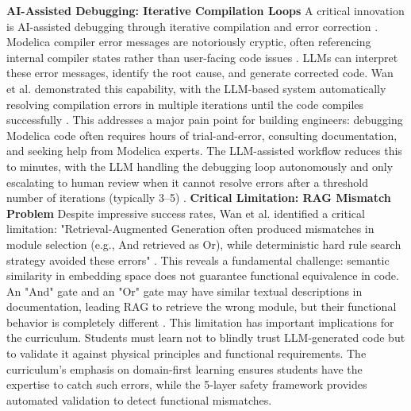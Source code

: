 \documentclass[12pt,a4paper]{article}
\begin{document}
\textbf{AI-Assisted Debugging: Iterative Compilation Loops}
A critical innovation is AI-assisted debugging through iterative compilation and error correction \cite{ref61}. Modelica compiler error messages are notoriously cryptic, often referencing internal compiler states rather than user-facing code issues \cite{ref61}. LLMs can interpret these error messages, identify the root cause, and generate corrected code. Wan et al. demonstrated this capability, with the LLM-based system automatically resolving compilation errors in multiple iterations until the code compiles successfully \cite{ref61}.
This addresses a major pain point for building engineers: debugging Modelica code often requires hours of trial-and-error, consulting documentation, and seeking help from Modelica experts. The LLM-assisted workflow reduces this to minutes, with the LLM handling the debugging loop autonomously and only escalating to human review when it cannot resolve errors after a threshold number of iterations (typically 3--5) \cite{ref61}.
\textbf{Critical Limitation: RAG Mismatch Problem}
Despite impressive success rates, Wan et al. identified a critical limitation: "Retrieval-Augmented Generation often produced mismatches in module selection (e.g., And retrieved as Or), while deterministic hard rule search strategy avoided these errors" \cite{ref61}. This reveals a fundamental challenge: semantic similarity in embedding space does not guarantee functional equivalence in code. An "And" gate and an "Or" gate may have similar textual descriptions in documentation, leading RAG to retrieve the wrong module, but their functional behavior is completely different \cite{ref61}.
This limitation has important implications for the curriculum. Students must learn not to blindly trust LLM-generated code but to validate it against physical principles and functional requirements. The curriculum's emphasis on domain-first learning ensures students have the expertise to catch such errors, while the 5-layer safety framework provides automated validation to detect functional mismatches.
\end{document}
